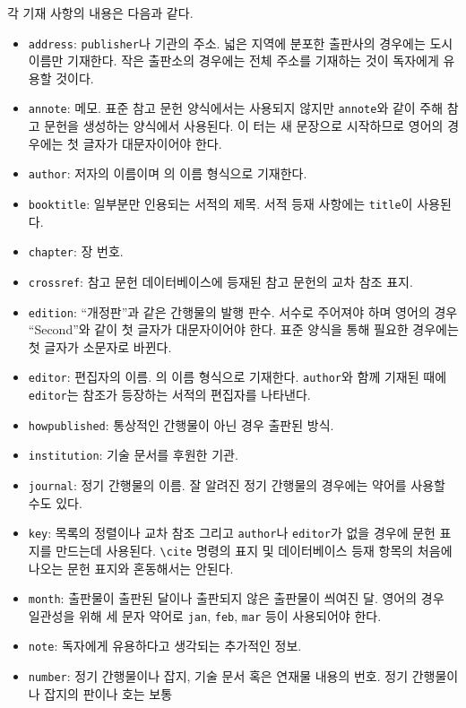 각 기재 사항의 내용은 다음과 같다.
\begin{itemize}
\item \texttt{address}: \texttt{publisher}나 기관의 주소.  넓은 지역에
  분포한 출판사의 경우에는 도시 이름만 기재한다.  작은 출판소의
  경우에는 전체 주소를 기재하는 것이 독자에게 유용할 것이다.
\item \texttt{annote}: 메모.  표준 참고 문헌 양식에서는 사용되지
  않지만 \texttt{annote}와 같이 주해 참고 문헌을 생성하는 양식에서
  사용된다.  이 터는 새 문장으로 시작하므로 영어의 경우에는 첫 글자가
  대문자이어야 한다.
\item \texttt{author}: 저자의 이름이며 \BibTeX 의 이름 형식으로 기재한다.
\item \texttt{booktitle}: 일부분만 인용되는 서적의 제목.  서적 등재
  사항에는 \texttt{title}이 사용된다.
\item \texttt{chapter}: 장 번호.
\item \texttt{crossref}: 참고 문헌 데이터베이스에 등재된 참고 문헌의
  교차 참조 표지.
\item \texttt{edition}: ``개정판''과 같은 간행물의 발행 판수.  서수로
  주어져야 하며 영어의 경우 ``Second''와 같이 첫 글자가 대문자이어야
  한다.  표준 양식을 통해 필요한 경우에는 첫 글자가 소문자로 바뀐다.
\item \texttt{editor}: 편집자의 이름.  \BibTeX{}의 이름 형식으로
  기재한다.  \texttt{author}와 함께 기재된 때에 \texttt{editor}는
  참조가 등장하는 서적의 편집자를 나타낸다.
\item \texttt{howpublished}: 통상적인 간행물이 아닌 경우 출판된 방식.
\item \texttt{institution}: 기술 문서를 후원한 기관.
\item \texttt{journal}: 정기 간행물의 이름.  잘 알려진 정기 간행물의
  경우에는 약어를 사용할 수도 있다.
\item \texttt{key}: 목록의 정렬이나 교차 참조 그리고 \texttt{author}나
  \texttt{editor}가 없을 경우에 문헌 표지를 만드는데 사용된다.
  \texttt{\textbackslash cite} 명령의 표지 및 데이터베이스 등재 항목의
  처음에 나오는 문헌 표지와 혼동해서는 안된다.
\item \texttt{month}: 출판물이 출판된 달이나 출판되지 않은 출판물이
  씌여진 달.  영어의 경우 일관성을 위해 세 문자 약어로 \texttt{jan},
  \texttt{feb}, \texttt{mar} 등이 사용되어야 한다.
\item \texttt{note}: 독자에게 유용하다고 생각되는 추가적인 정보.
\item \texttt{number}: 정기 간행물이나 잡지, 기술 문서 혹은 연재물
  내용의 번호.  정기 간행물이나 잡지의 판이나 호는 보통

\end{itemize}
